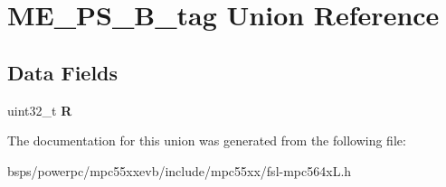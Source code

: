 \hypertarget{unionME__PS__32B__tag}{}\section{M\+E\+\_\+\+P\+S\+\_\+B\+\_\+tag Union Reference}
\label{unionME__PS__32B__tag}
\subsection*{Data Fields}
\begin{DoxyCompactItemize}
\item 
\mbox{\label{unionME__PS__32B__tag_af5ce078ec8caa46a7d1b3d24e5ccd2a4}} 
uint32\+\_\+t {\bfseries R}
\end{DoxyCompactItemize}


The documentation for this union was generated from the following file\+:\begin{DoxyCompactItemize}
\item 
bsps/powerpc/mpc55xxevb/include/mpc55xx/fsl-\/mpc564x\+L.\+h\end{DoxyCompactItemize}
